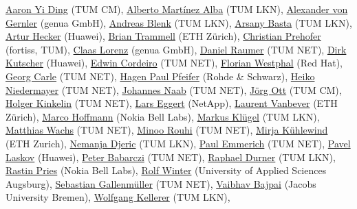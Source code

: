 \href{}{Aaron Yi Ding} (TUM CM),
\href{}{Alberto Martínez Alba} (TUM LKN),
\href{}{Alexander von Gernler} (genua GmbH),
\href{}{Andreas Blenk} (TUM LKN),
\href{}{Arsany Basta} (TUM LKN),
\href{}{Artur Hecker} (Huawei),
\href{}{Brian Trammell} (ETH Zürich),
\href{}{Christian Prehofer} (fortiss, TUM),
\href{}{Claas Lorenz} (genua GmbH),
\href{}{Daniel Raumer} (TUM NET),
\href{}{Dirk Kutscher} (Huawei),
\href{}{Edwin Cordeiro} (TUM NET),
\href{}{Florian Westphal} (Red Hat),
\href{}{Georg Carle} (TUM NET),
\href{}{Hagen Paul Pfeifer} (Rohde \& Schwarz),
\href{}{Heiko Niedermayer} (TUM NET),
\href{}{Johannes Naab} (TUM NET),
\href{}{Jörg Ott} (TUM CM),
\href{}{Holger Kinkelin} (TUM NET),
\href{}{Lars Eggert} (NetApp),
\href{}{Laurent Vanbever} (ETH Zürich),
\href{}{Marco Hoffmann} (Nokia Bell Labs),
\href{}{Markus Klügel} (TUM LKN),
\href{}{Matthias Wachs} (TUM NET),
\href{}{Minoo Rouhi} (TUM NET),
\href{}{Mirja Kühlewind} (ETH Zurich),
\href{}{Nemanja Djeric} (TUM LKN),
\href{}{Paul Emmerich} (TUM NET),
\href{}{Pavel Laskov} (Huawei),
\href{}{Peter Babarczi} (TUM NET),
\href{}{Raphael Durner} (TUM LKN),
\href{}{Rastin Pries} (Nokia Bell Labs),
\href{}{Rolf Winter} (University of Applied Sciences Augsburg),
\href{}{Sebastian Gallenmüller} (TUM NET),
\href{}{Vaibhav Bajpai} (Jacobs University Bremen),
\href{}{Wolfgang Kellerer} (TUM LKN),

